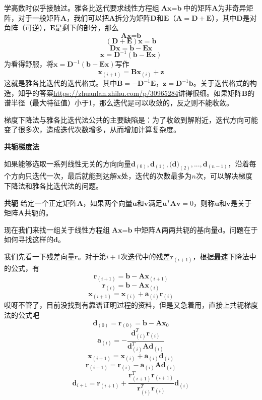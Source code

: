 \documentclass{article}
\begin{document}
					学高数时似乎接触过。雅各比迭代要求线性方程组$\textbf{A}\textbf{x}=\textbf{b}$中的矩阵$\textbf{A}$为非奇异矩阵，对于一般矩阵$\textbf{A}$，我们可以把$\textbf{A}$拆分为矩阵$\textbf{D}$和$\textbf{E}$（$\textbf{A}=\textbf{D}+\textbf{E}$），其中$\textbf{D}$是对角阵（可逆），$\textbf{E}$是剩下的部分，那么
					$$\textbf{A}\textbf{x}=\textbf{b}$$
					$$(\textbf{D}+\textbf{E})\textbf{x}=\textbf{b}$$
					$$\textbf{D}\textbf{x}=\textbf{b}-\textbf{E}\textbf{x}$$
					$$\textbf{x}=\textbf{D}^{-1}(\textbf{b}-\textbf{E}\textbf{x})$$
					为看得舒服，将$\textbf{x}=\textbf{D}^{-1}(\textbf{b}-\textbf{E}\textbf{x})$写作
					$$\textbf{x}_{(i+1)}=\textbf{B}\textbf{x}_{(i)}+\textbf{z}$$
					这就是雅各比迭代的迭代格式。其中$\textbf{B}=-\textbf{D}^{-1}\textbf{E}$，$\textbf{z}=\textbf{D}^{-1}\textbf{b}$。关于迭代格式的构造，知乎的答案\url{https://zhuanlan.zhihu.com/p/30965284}讲得很细。如果矩阵$\textbf{B}$的谱半径（最大特征值）小于1，那么迭代是可以收敛的，反之则不能收敛。
					
					梯度下降法与雅各比迭代法公共的主要缺陷是：为了收敛到解附近，迭代方向可能变了很多次，造成迭代次数增多，从而增加计算复杂度。
					
					\textbf{共轭梯度法}
					
					如果能够选取一系列线性无关的方向向量$\textbf{d}_{(0)},\textbf{d}_{(1)},\textbf{(d)}_{(2)},...,\textbf{d}_{(n-1)}$，沿着每个方向只迭代一次，最后就能到达解$\textbf{x}$处，迭代的次数最多为$n$次，可以解决梯度下降法和雅各比迭代法的问题。
					
					\textbf{共轭} 给定一个正定矩阵$\textbf{A}$，如果两个向量$\textbf{u}$和$\textbf{v}$满足$\textbf{u}^{T}\textbf{A}\textbf{v}=0$，则称$\textbf{u}$和$\textbf{v}$是关于矩阵$\textbf{A}$共轭的。
					
					现在我们来找一组关于线性方程组$\textbf{A}\textbf{x}=\textbf{b}$中矩阵$\textbf{A}$两两共轭的基向量$\textbf{d}$。问题在于如何寻找这样的$\textbf{d}$。
					
					我们先看一下残差向量$\textbf{r}$。对于第$i+1$次迭代中的残差$\textbf{r}_{(i+1)}$，根据最速下降法中的公式，有
					$$\textbf{r}_{(i+1)}=\textbf{b}-\textbf{A}\textbf{x}_{(i+1)}$$
					$$\textbf{r}_{(i)}=\textbf{b}-\textbf{A}\textbf{x}_{(i)}$$
					$$\textbf{x}_{(i+1)}=\textbf{x}_{(i)}+\textbf{a}_{(i)}\textbf{r}_{(i)}$$
					哎呀不管了，目前没找到有靠谱证明过程的资料，但是又急着用，直接上共轭梯度法的公式吧
					$$\textbf{d}_{(0)}=\textbf{r}_{(0)}=\textbf{b}-\textbf{A}\textbf{x}_{0}$$
					$$\textbf{a}_{(i)}=-\frac{\textbf{d}^{T}_{(i)}\textbf{r}_{(i)}}{\textbf{d}^{T}_{(i)}\textbf{A}\textbf{d}_{(i)}}$$
					$$\textbf{x}_{(i+1)}=\textbf{x}_{(i)}+\textbf{a}_{(i)}\textbf{d}_{(i)}$$
					$$\textbf{r}_{(i+1)}=\textbf{r}_{(i)}-\textbf{a}_{(i)}\textbf{A}\textbf{d}_{(i)}$$
					$$\textbf{d}_{i+1}=\textbf{r}_{(i+1)}+\frac{\textbf{r}^{T}_{(i+1)}\textbf{r}_{(i+1)}}{\textbf{r}^{T}_{(i)}\textbf{r}_{(i)}}\textbf{d}_{(i)}$$
					
\end{document}
